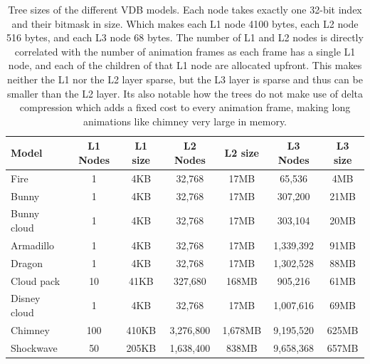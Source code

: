 \begin{table}[htbp]
    \centering
    \begin{tabularx}{\textwidth}{|X|c|c|c|c|c|c|}
    \hline
    \textbf{Model} & \textbf{L1 Nodes} & \textbf{L1 size} & \textbf{L2 Nodes} & \textbf{L2 size} & \textbf{L3 Nodes} & \textbf{L3 size} \\
    \hline
    Fire & 1 & 4KB & 32,768 & 17MB & 65,536 & 4MB\\
    \hline
    Bunny & 1 & 4KB & 32,768 & 17MB & 307,200 & 21MB\\
    \hline
    Bunny cloud & 1 & 4KB & 32,768 & 17MB & 303,104 & 20MB\\
    \hline
    Armadillo & 1 & 4KB & 32,768 & 17MB & 1,339,392 & 91MB\\
    \hline
    Dragon & 1 & 4KB & 32,768 & 17MB & 1,302,528 & 88MB\\
    \hline
    Cloud pack & 10 & 41KB & 327,680 & 168MB & 905,216 & 61MB\\
    \hline
    Disney cloud & 1 & 4KB & 32,768 & 17MB & 1,007,616 & 69MB\\
    \hline
    Chimney & 100 & 410KB & 3,276,800 & 1,678MB & 9,195,520 & 625MB\\
    \hline
    Shockwave & 50 & 205KB & 1,638,400 & 838MB & 9,658,368 & 657MB\\
    \hline
    \end{tabularx}
    \caption{Tree sizes of the different VDB models. Each node takes exactly one 32-bit index and their bitmask in size. Which makes each L1 node 4100 bytes, each L2 node 516 bytes, and each L3 node 68 bytes. The number of L1 and L2 nodes is directly correlated with the number of animation frames as each frame has a single L1 node, and each of the children of that L1 node are allocated upfront. This makes neither the L1 nor the L2 layer sparse, but the L3 layer is sparse and thus can be smaller than the L2 layer. Its also notable how the trees do not make use of delta compression which adds a fixed cost to every animation frame, making long animations like chimney very large in memory.}
    \label{tab:tree_sizes}
\end{table}

